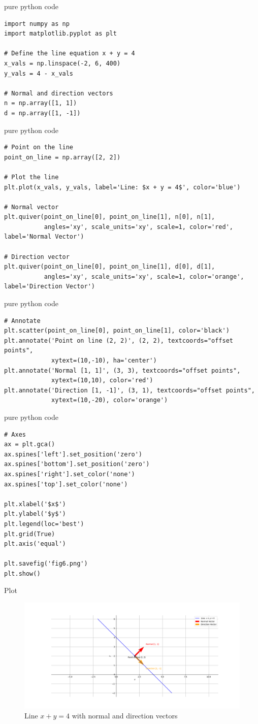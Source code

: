 \documentclass{beamer}
\begin{document}
\begin{frame}[fragile]{pure python code}
\begin{lstlisting}
import numpy as np
import matplotlib.pyplot as plt

# Define the line equation x + y = 4
x_vals = np.linspace(-2, 6, 400)
y_vals = 4 - x_vals

# Normal and direction vectors
n = np.array([1, 1])
d = np.array([1, -1])
\end{lstlisting}
\end{frame}

\begin{frame}[fragile]{pure python code}
\begin{lstlisting}
# Point on the line
point_on_line = np.array([2, 2])

# Plot the line
plt.plot(x_vals, y_vals, label='Line: $x + y = 4$', color='blue')

# Normal vector
plt.quiver(point_on_line[0], point_on_line[1], n[0], n[1],
           angles='xy', scale_units='xy', scale=1, color='red', label='Normal Vector')

# Direction vector
plt.quiver(point_on_line[0], point_on_line[1], d[0], d[1],
           angles='xy', scale_units='xy', scale=1, color='orange', label='Direction Vector')
\end{lstlisting}
\end{frame}

\begin{frame}[fragile]{pure python code}
\begin{lstlisting}
# Annotate
plt.scatter(point_on_line[0], point_on_line[1], color='black')
plt.annotate('Point on line (2, 2)', (2, 2), textcoords="offset points",
             xytext=(10,-10), ha='center')
plt.annotate('Normal [1, 1]', (3, 3), textcoords="offset points",
             xytext=(10,10), color='red')
plt.annotate('Direction [1, -1]', (3, 1), textcoords="offset points",
             xytext=(10,-20), color='orange')
\end{lstlisting}
\end{frame}


\begin{frame}[fragile]{pure python code}
\begin{lstlisting}
# Axes
ax = plt.gca()
ax.spines['left'].set_position('zero')
ax.spines['bottom'].set_position('zero')
ax.spines['right'].set_color('none')
ax.spines['top'].set_color('none')

plt.xlabel('$x$')
plt.ylabel('$y$')
plt.legend(loc='best')
plt.grid(True)
plt.axis('equal')

plt.savefig('fig6.png')
plt.show()
\end{lstlisting}
\end{frame}

\begin{frame}{Plot}
\begin{figure}[H]
\centering
\includegraphics[width=0.65\linewidth]{figs/fig6.png}
\caption{Line $x+y=4$ with normal and direction vectors}
\end{figure}
\end{frame}
\end{document}
